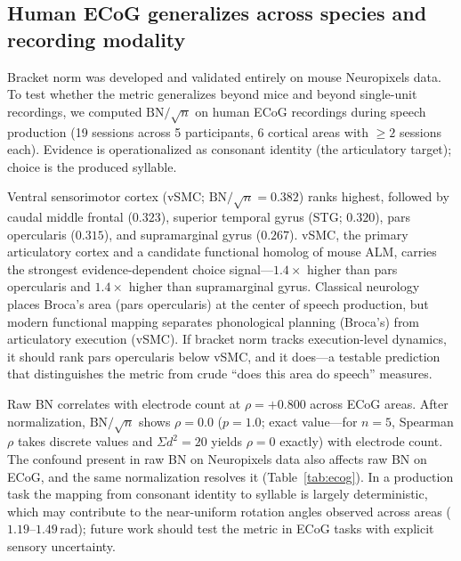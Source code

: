 \documentclass[9pt,lineno]{elife}
\begin{document}
\subsection{Human ECoG generalizes across species and recording modality}
\label{sec:ecog}

Bracket norm was developed and validated entirely on mouse Neuropixels data. To test whether the metric generalizes beyond mice and beyond single-unit recordings, we computed $\text{BN}/\!\sqrt{n}$ on human ECoG recordings during speech production \citep{dandi000019} (19 sessions across 5 participants, 6 cortical areas with $\geq 2$ sessions each). Evidence is operationalized as consonant identity (the articulatory target); choice is the produced syllable.

Ventral sensorimotor cortex (vSMC; $\text{BN}/\!\sqrt{n} = 0.382$) ranks highest, followed by caudal middle frontal ($0.323$), superior temporal gyrus (STG; $0.320$), pars opercularis ($0.315$), and supramarginal gyrus ($0.267$). vSMC, the primary articulatory cortex and a candidate functional homolog of mouse ALM, carries the strongest evidence-dependent choice signal---$1.4\times$ higher than pars opercularis and $1.4\times$ higher than supramarginal gyrus. Classical neurology places Broca's area (pars opercularis) at the center of speech production, but modern functional mapping separates phonological planning (Broca's) from articulatory execution (vSMC). If bracket norm tracks execution-level dynamics, it should rank pars opercularis below vSMC, and it does---a testable prediction that distinguishes the metric from crude ``does this area do speech'' measures.

Raw BN correlates with electrode count at $\rho = +0.800$ across ECoG areas. After normalization, $\text{BN}/\!\sqrt{n}$ shows $\rho = 0.0$ ($p = 1.0$; exact value---for $n = 5$, Spearman $\rho$ takes discrete values and $\Sigma d^2 = 20$ yields $\rho = 0$ exactly) with electrode count. The confound present in raw BN on Neuropixels data also affects raw BN on ECoG, and the same normalization resolves it (Table~\ref{tab:ecog}). In a production task the mapping from consonant identity to syllable is largely deterministic, which may contribute to the near-uniform rotation angles observed across areas ($1.19$--$1.49$\,rad); future work should test the metric in ECoG tasks with explicit sensory uncertainty.
\end{document}
